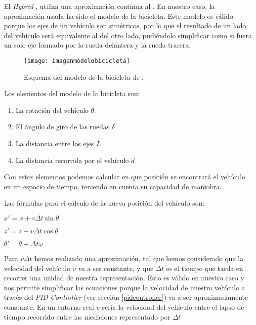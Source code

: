 El \textit{Hybrid \Astar}, utiliza una aproximación continua al \Astar. En nuestro caso, la aproximación usada ha sido el modelo de la bicicleta. Este modelo es válido porque los ejes de un vehículo son simétricos, por lo que el resultado de un lado del vehículo será equivalente al del otro lado, pudiéndolo simplificar como si fuera un solo eje formado por la rueda delantera y la rueda trasera.
\begin{figure}[htpb]
    \centering
    \texttt{[image: imagenmodelobicicleta]}
    \caption[Esquema del modelo de la bicicleta]{Esquema del modelo de la bicicleta de \cite{articuloimagenmodelobicicleta}.}
    \label{fig:basics AFM sketch}
\end{figure}

Los elementos del modelo de la bicicleta son:
\begin{enumerate}
\item La rotación del vehículo $\theta$.
\item El ángulo de giro de las ruedas $\delta$
\item La distancia entre los ejes $L$
\item La distancia recorrida por el vehículo $d$
\end{enumerate}

Con estos elementos podemos calcular en que posición se encontrará el vehículo en un espacio de tiempo, teniendo en cuenta su capacidad de maniobra.

\label{formulashybrid}Las fórmulas para el cálculo de la nueva posición del vehículo son:
\begin{center}
$x' = x +  v \Delta t \sin \theta$

$z' = z +  v \Delta t \cos \theta$

$\theta' = \theta + \Delta t \omega $
\end{center}

Para $v \Delta t$ hemos realizado una aproximación, tal que hemos considerado que la velocidad del vehículo $v$ va a ser constante, y que $\Delta t$ es el tiempo que tarda en recorrer una unidad de nuestra representación. Esto es válido en nuestro caso y nos permite simplificar las ecuaciones porque la velocidad de nuestro vehículo a través del \textit{PID Controller} (ver sección \ref{pidcontroller}) va a ser aproximadamente constante. En un entorno real $v$ sería la velocidad del vehículo entre el lapso de tiempo recorrido entre las mediciones representado por $\Delta t$ 

